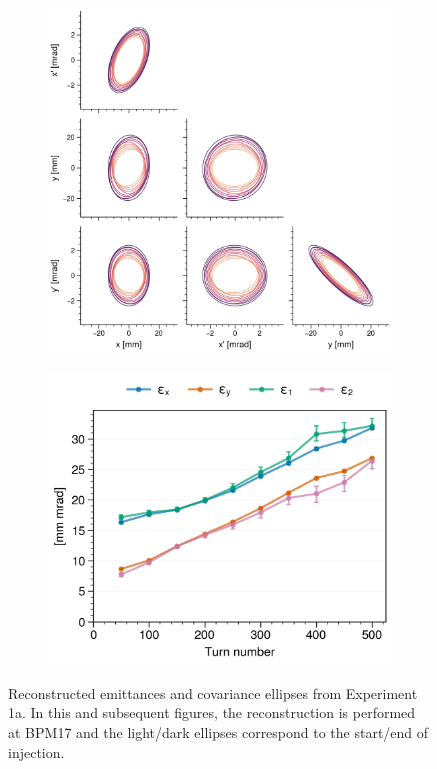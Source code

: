 %
%
\begin{figure}[!p]
    \centering
    \begin{subfigure}{0.6\textwidth}
        \includegraphics[width=\textwidth]{Images/chapter5/exp1a/corner.png}
    \end{subfigure}
    \hfill
    \begin{subfigure}[t]{0.39\textwidth}
        \includegraphics[width=\textwidth]{Images/chapter5/exp1a/emittances.png}
    \end{subfigure}
    \caption{Reconstructed emittances and covariance ellipses from Experiment 1a. In this and subsequent figures, the reconstruction is performed at BPM17 and the light/dark ellipses correspond to the start/end of injection.}
    \label{fig:exp1a_emittances}
\end{figure}
